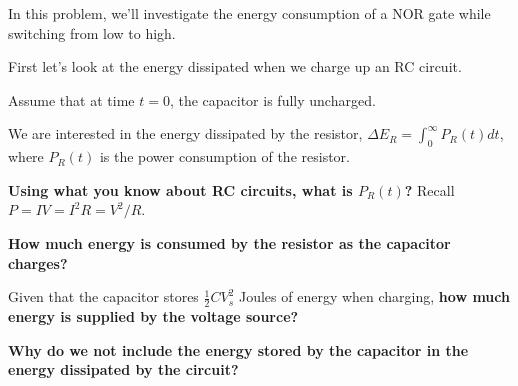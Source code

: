 
In this problem, we'll investigate the energy consumption of a NOR gate while switching from low to high.

First let's look at the energy dissipated when we charge up an RC circuit.



Assume that at time $t = 0$, the capacitor is fully uncharged.

\begin{enumerate}

\qitem We are interested in the energy dissipated by the resistor, $\Delta E_R = \int_0^\infty P_R(t) dt$, where $P_R(t)$ is the power consumption of the resistor. 

\textbf{Using what you know about RC circuits, what is $P_R(t)$?} Recall $P = IV = I^2R = V^2 / R$.

\ws{\vspace{75px}}



\qitem \textbf{How much energy is consumed by the resistor as the capacitor charges?}

\ws{\vspace{75px}}


\qitem Given that the capacitor stores $\frac{1}{2}CV_s^2$ Joules of energy when charging, \textbf{how much energy is supplied by the voltage source?}

\textbf{Why do we not include the energy stored by the capacitor in the energy dissipated by the circuit?}

\ws{\vspace{100px}}

\end{enumerate}
